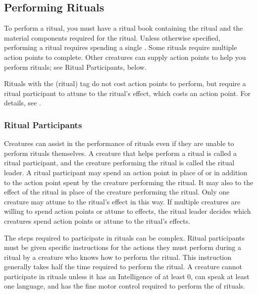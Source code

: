     \subsection{Performing Rituals}
        To perform a ritual, you must have a ritual book containing the ritual and the material components required for the ritual.
        Unless otherwise specified, performing a ritual requires spending a single .
        Some rituals require multiple action points to complete.
        Other creatures can supply action points to help you perform rituals; see Ritual Participants, below.


        Rituals with the  (ritual) tag do not cost action points to perform, but require a ritual participant to attune to the ritual's effect, which costs an action point.
        For details, see .

        \subsubsection{Ritual Participants}
            Creatures can assist in the performance of rituals even if they are unable to perform rituals themselves.
            A creature that helps perform a ritual is called a ritual participant, and the creature performing the ritual is called the ritual leader.
            A ritual participant may spend an action point in place of or in addition to the action point spent by the creature performing the ritual.
            It may also  to the effect of the ritual in place of the creature performing the ritual.
            Only one creature may attune to the ritual's effect in this way.
            If multiple creatures are willing to spend action points or attune to effects, the ritual leader decides which creatures spend action points or attune to the ritual's effects.

            The steps required to participate in rituals can be complex.
            Ritual participants must be given specific instructions for the actions they must perform during a ritual by a creature who knows how to perform the ritual.
            This instruction generally takes half the time required to perform the ritual.
            A creature cannot participate in rituals unless it has an Intelligence of at least 0, can speak at least one language, and has the fine motor control required to perform the  of rituals.

